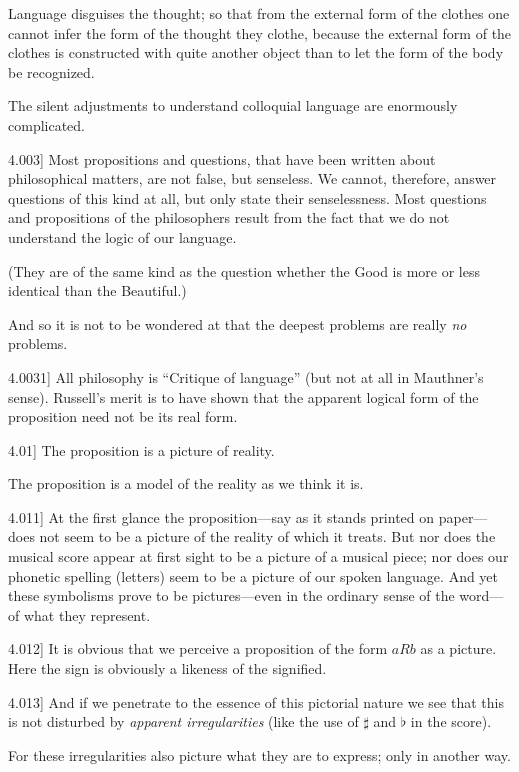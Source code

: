 \documentclass[12pt,oneside]{book}[2007/10/19]
\newcommand{\PropositionE}[2]{%
  \item[\phantomsection\label{PropE:#1}\PropGRef{#1}] #2%
}
\newcommand{\PropGRef}[1]{\hyperref[PropG:#1]{#1}}
\begin{document}
\begin{propositions}
{Language disguises the thought; so that from
the external form of the clothes one cannot infer
the form of the thought they clothe, because the
external form of the clothes is constructed with
quite another object than to let the form of the
body be recognized.

The silent adjustments to understand colloquial
language are enormously complicated.}


\PropositionE{4.003}
{Most propositions and questions, that have been
written about philosophical matters, are not false, but
senseless. We cannot, therefore, answer questions
of this kind at all, but only state their senselessness.
Most questions and propositions of the philosophers
result from the fact that we do not understand the
logic of our language.

(They are of the same kind as the question
whether the Good is more or less identical than the
Beautiful.)

And so it is not to be wondered at that the
deepest problems are really \emph{no} problems.}


\PropositionE{4.0031}
{All philosophy is ``Critique of language'' (but
not at all in Mauthner's sense). Russell's merit is
to have shown that the apparent logical form of the
proposition need not be its real form.}


\PropositionE{4.01}
{The proposition is a picture of reality.

The proposition is a model of the reality as we
think it is.}


\PropositionE{4.011}
{At the first glance the proposition---say as it
stands printed on paper---does not seem to be a
picture of the reality of which it treats. But nor
does the musical score appear at first sight to be a
picture of a musical piece; nor does our phonetic
spelling (letters) seem to be a picture of our spoken
language. And yet these symbolisms prove to be
pictures---even in the ordinary sense of the word---of
what they represent.}


\PropositionE{4.012}
{It is obvious that we perceive a proposition
of the form $aRb$ as a picture. Here the sign is
obviously a likeness of the signified.}


\PropositionE{4.013}
{And if we penetrate to the essence of this
pictorial nature we see that this is not disturbed
by \emph{apparent irregularities} (like the use of $\sharp$ and $\flat$ in
the score).

For these irregularities also picture what they
are to express; only in another way.}



\end{propositions}
\end{document}

